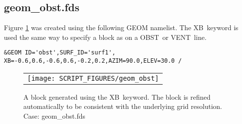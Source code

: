 \documentclass[12pt]{article}
\begin{document}
%
%
%
%
%

\subsection{geom\_obst.fds}
Figure \ref{fig:geom_obst} was created using the following GEOM namelist.
The {\ct XB}\ keyword is used the same way to specify a block as on
a {\ct OBST}\ or {\ct VENT}\ line.

{\scriptsize
\begin{verbatim}
&GEOM ID='obst',SURF_ID='surf1', XB=-0.6,0.6,-0.6,0.6,-0.2,0.2,AZIM=90.0,ELEV=30.0 /
\end{verbatim}
}

\begin{figure}
\begin{center}
\begin{tabular}{c}
 \texttt{[image: SCRIPT\_FIGURES/geom\_obst]}
  \end{tabular}
\end{center}
 \caption{A block generated using the {\ct XB}\ keyword.  The block is refined automatically to be consistent with the underlying grid resolution. Case: geom\_obst.fds}
\label{fig:geom_obst}
\end{figure}
\end{document}
